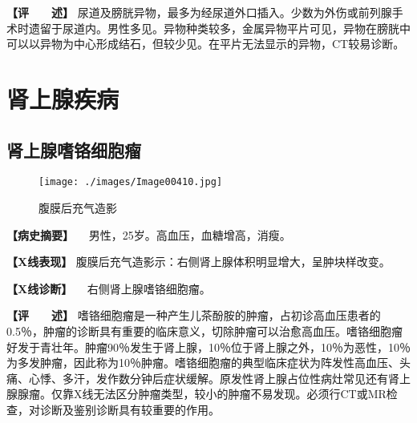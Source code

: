 \textbf{【评　　述】}
尿道及膀胱异物，最多为经尿道外口插入。少数为外伤或前列腺手术时遗留于尿道内。男性多见。异物种类较多，金属异物平片可见，异物在膀胱中可以以异物为中心形成结石，但较少见。在平片无法显示的异物，CT较易诊断。

\section{肾上腺疾病}

\subsection{肾上腺嗜铬细胞瘤}

\begin{figure}[!htbp]
    \centering
    \texttt{[image: ./images/Image00410.jpg]}
    \captionsetup{justification=centering}
    \caption{腹膜后充气造影}
    \label{fig6-8-1}
\end{figure}

\textbf{【病史摘要】} 　男性，25岁。高血压，血糖增高，消瘦。

\textbf{【X线表现】}
腹膜后充气造影示：右侧肾上腺体积明显增大，呈肿块样改变。

\textbf{【X线诊断】} 　右侧肾上腺嗜铬细胞瘤。

\textbf{【评　　述】}
嗜铬细胞瘤是一种产生儿茶酚胺的肿瘤，占初诊高血压患者的0.5％，肿瘤的诊断具有重要的临床意义，切除肿瘤可以治愈高血压。嗜铬细胞瘤好发于青壮年。肿瘤90％发生于肾上腺，10％位于肾上腺之外，10％为恶性，10％为多发肿瘤，因此称为10％肿瘤。嗜铬细胞瘤的典型临床症状为阵发性高血压、头痛、心悸、多汗，发作数分钟后症状缓解。原发性肾上腺占位性病灶常见还有肾上腺腺瘤。仅靠X线无法区分肿瘤类型，较小的肿瘤不易发现。必须行CT或MR检查，对诊断及鉴别诊断具有较重要的作用。

\protect\hypertarget{text00012.html}{}{}

